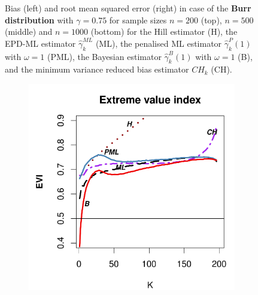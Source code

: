 \begin{figure}[h]
\begin{subfigure}[h]{0.40\linewidth}
		\end{subfigure}
		\caption{Bias (left) and root mean squared error (right) in case of the \textbf{Burr distribution} with $\gamma=0.75$ for sample sizes $n=200$ (top), $n=500$ (middle) and $n=1000$ (bottom) for the Hill estimator (H), the EPD-ML estimator $\hat{\gamma}_{k}^{ML}$ (ML), the penalised ML estimator $\hat{\gamma}^P_{k}(1)$ with $\omega=1$ (PML), the Bayesian estimator $\hat{\gamma}^B_{k}(1)$ with $\omega=1$ (B), and the minimum variance reduced bias estimator $CH_k$ (CH).}
		\label{paper1:fig3}
	\end{figure}
	\begin{figure}[h]
		\centering
		\begin{subfigure}[h]{0.40\linewidth}
			\includegraphics[width=\textwidth]{./plots/paper1/EVI_Outputloggamma0,5200.pdf}
		\end{subfigure}
	\hspace{\fill}
		\begin{subfigure}[h]{0.40\linewidth}

\end{subfigure}
\end{figure}
